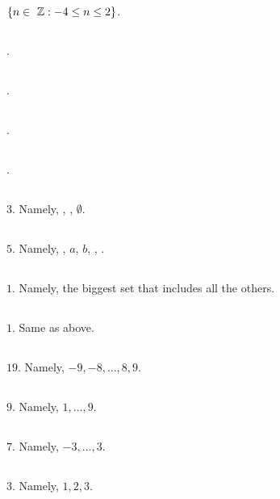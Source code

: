    \subsection{} $\{n \in \integerset: -4 \leq n \leq 2\}$.
   \subsection{} .
   \subsection{} .
   \subsection{} .
   \subsection{} .
   \subsection{} $3$. Namely, , , $\emptyset$.
   \subsection{} $5$. Namely, , $a$, $b$, , \set{\emptyset}.
   \subsection{} $1$. Namely, the biggest set that includes all the others.
   \subsection{} $1$. Same as above.
   \subsection{} $19$. Namely, $-9,-8,\ldots,8,9$.
   \subsection{} $9$. Namely, $1,\ldots,9$.
   \subsection{} $7$. Namely, $-3,\ldots,3$.
   \subsection{} $3$. Namely, $1,2,3$.
